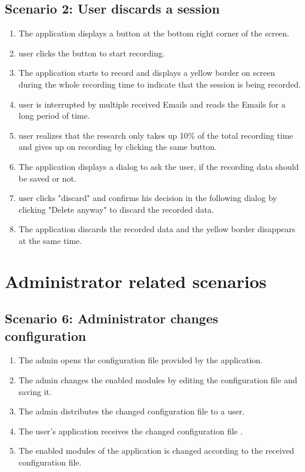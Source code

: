 \subsection{Scenario 2: User discards a session}
\begin{enumerate}
    \item The application displays a button at the bottom right corner of the screen.
    \item \Gls{user} clicks the button to start recording.
    \item The application starts to record and displays a yellow border on screen during the whole recording time to indicate that the \gls{session} is being recorded.
    \item \Gls{user} is interrupted by multiple received Emails and reads the Emails for a long period of time.
    \item \Gls{user} realizes that the research only takes up 10\% of the total recording time and gives up on recording by clicking the same button.
    \item The application displays a dialog to ask the \gls{user}, if the recording data should be saved or not.
    \item \Gls{user} clicks "discard" and confirms his decision in the following dialog by clicking "Delete anyway" to discard the recorded data.
    \item The application discards the recorded data and the yellow border disappears at the same time.
\end{enumerate}

\setcounter{subsection}{3} %
\setcounter{subsection}{4} %

\setcounter{section}{2} %

\section{Administrator related scenarios}
\subsection{Scenario 6: Administrator changes configuration}
\begin{enumerate}
    \item The \gls{admin} opens the configuration file provided by the application.
    \item The \gls{admin} changes the enabled modules by editing the configuration file and saving it.
    \item The \gls{admin} distributes the changed configuration file to a \gls{user}.
    \item The \gls{user}'s application receives the changed configuration file .
    \item The enabled modules of the application is changed according to the received configuration file.
\end{enumerate}

